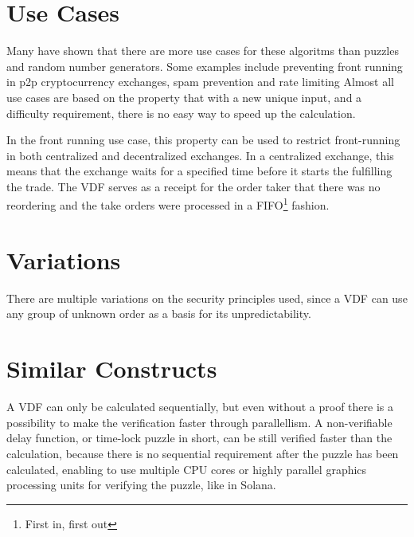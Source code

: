 \section{Use Cases}
Many have shown that there are more use cases for these algoritms than puzzles and random number generators. Some examples include preventing front running in p2p cryptocurrency exchanges, spam prevention and rate limiting\cite{noauthor_undated-hk} Almost all use cases are based on the property that with a new unique input, and a difficulty requirement, there is no easy way to speed up the calculation.

In the front running use case, this property can be used to restrict front-running in both centralized and decentralized exchanges.\cite{Khalil2019-sl} In a centralized exchange, this means that the exchange waits for a specified time before it starts the fulfilling the trade. The VDF serves as a receipt for the order taker that there was no reordering and the take orders were processed in a FIFO\footnote{First in, first out} fashion.\cite{Cline2020-wb}

\section{Variations}
There are multiple variations on the security principles used, since a VDF can use any group of unknown order as a basis for its unpredictability.

\section{Similar Constructs}
A VDF can only be calculated sequentially, but even without a proof there is a possibility to make the verification faster through parallellism. A non-verifiable delay function, or time-lock puzzle in short, can be still verified faster than the calculation, because there is no sequential requirement after the puzzle has been calculated, enabling to use multiple CPU cores or highly parallel graphics processing units for verifying the puzzle, like in Solana.\cite{Yakovenko2018-zn} 

